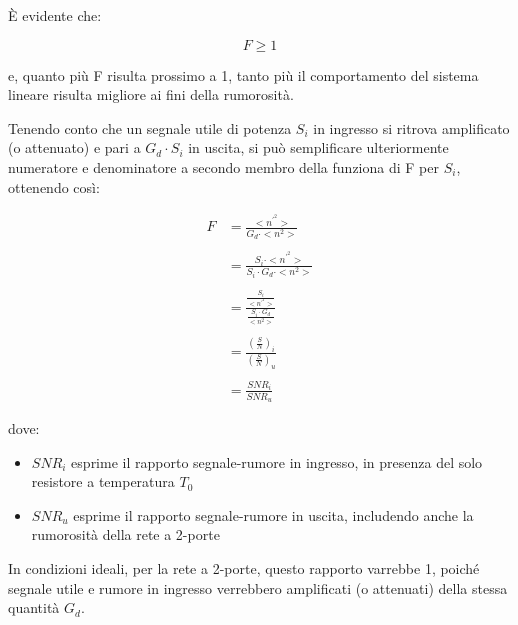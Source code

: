 È evidente che: 

{
    \Large 
    \begin{equation}
        F \ge 1
    \end{equation}
}

e, quanto più F risulta prossimo a 1, tanto più il comportamento del sistema lineare risulta migliore ai fini della rumorosità. \newline 

Tenendo conto che un segnale utile di potenza $S_i$ in ingresso si ritrova amplificato (o attenuato) e pari a $G_d \cdot S_i$ in uscita, 
si può semplificare ulteriormente numeratore e denominatore a secondo membro della funziona di F per $S_i$, ottenendo così: 

{
    \Large 
    \begin{equation}
        \begin{split}
            F &= \frac{<n^{'^{2}}>}{G_d \cdot <n^{2}>}
            \\
            &\quad
            \\
            &= \frac{S_i \cdot <n^{'^{2}}>}{S_i \cdot G_d \cdot <n^{2}>}
            \\
            &\quad
            \\
            &= \frac{\frac{S_i}{<n^{'^{2}}>}}{\frac{S_i \cdot G_d}{<n^{2}>} }
            \\
            &\quad
            \\
            &= \frac{\left( \frac{S}{N}\right)_{i}}{\left( \frac{S}{N}\right)_{u}}
            \\
            &\quad
            \\
            &= \frac{SNR_i}{SNR_u}
        \end{split}
    \end{equation}
}

dove: 

\begin{itemize}
    \item $SNR_i$ esprime il rapporto segnale-rumore in ingresso, in presenza del solo resistore a temperatura $T_0$
    \item $SNR_u$ esprime il rapporto segnale-rumore in uscita, includendo anche la rumorosità della rete a 2-porte
\end{itemize}

In condizioni ideali, per la rete a 2-porte, questo rapporto varrebbe 1, 
poiché segnale utile e rumore in ingresso verrebbero amplificati (o attenuati) della stessa quantità $G_d$. \newline 

